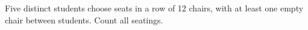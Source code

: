 Five distinct students choose seats in a row of 12 chairs, with at least one empty chair between students. Count all seatings.
